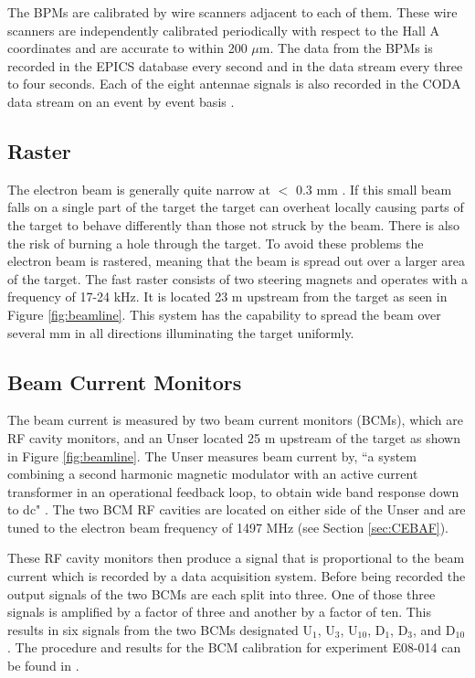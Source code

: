 The BPMs are calibrated by wire scanners adjacent to each of them. These wire scanners are independently calibrated periodically with respect to the Hall A coordinates and are accurate to within 200 $\mu$m. The data from the BPMs is recorded in the EPICS database every second and in the data stream every three to four seconds. Each of the eight antennae signals is also recorded in the CODA data stream on an event by event basis \cite{Thesis:Ye}. 

\subsection{Raster}
\label{ssec:raster}

The electron beam is generally quite narrow at $<$ 0.3 mm \cite{Thesis:Wang}. If this small beam falls on a single part of the target the target can overheat locally causing parts of the target to behave differently than those not struck by the beam. There is also the risk of burning a hole through the target. To avoid these problems the electron beam is rastered, meaning that the beam is spread out over a larger area of the target. The fast raster consists of two steering magnets and operates with a frequency of 17-24 kHz. It is located 23 m upstream from the target \cite{Article:HallA} as seen in Figure \ref{fig:beamline}. This system has the capability to spread the beam over several mm in all directions illuminating the target uniformly. 

\subsection{Beam Current Monitors}
\label{ssec:bcms}

The beam current is measured by two beam current monitors (BCMs), which are RF cavity monitors, and an Unser located 25 m upstream of the target \cite{Article:HallA} as shown in Figure \ref{fig:beamline}. The Unser measures beam current by, ``a system combining a second harmonic magnetic modulator with an active current transformer in an operational feedback loop, to obtain wide band response down to dc" \cite{Article:Unser}. The two BCM RF cavities are located on either side of the Unser and are tuned to the electron beam frequency of 1497 MHz (see Section \ref{sec:CEBAF}). 

These RF cavity monitors then produce a signal that is proportional to the beam current which is recorded by a data acquisition system. Before being recorded the output signals of the two BCMs are each split into three. One of those three signals is amplified by a factor of three and another by a factor of ten. This results in six signals from the two BCMs designated U$_1$, U$_3$, U$_{10}$, D$_1$, D$_3$, and D$_{10}$. The procedure and results for the BCM calibration for experiment E08-014 can be found in \cite{bcm_calibration}. 

